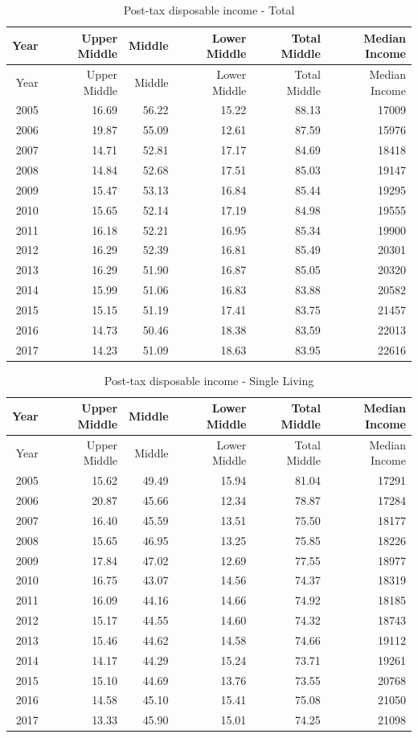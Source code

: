 \documentclass[12pt,]{article}
\begin{document}
\begin{longtable}[]{@{}rrrrrr@{}}
\caption{Post-tax disposable income - Total}\tabularnewline
\toprule
Year & Upper Middle & Middle & Lower Middle & Total Middle & Median
Income\tabularnewline
\midrule
\endfirsthead
\toprule
Year & Upper Middle & Middle & Lower Middle & Total Middle & Median
Income\tabularnewline
\midrule
\endhead
2005 & 16.69 & 56.22 & 15.22 & 88.13 & 17009\tabularnewline
2006 & 19.87 & 55.09 & 12.61 & 87.59 & 15976\tabularnewline
2007 & 14.71 & 52.81 & 17.17 & 84.69 & 18418\tabularnewline
2008 & 14.84 & 52.68 & 17.51 & 85.03 & 19147\tabularnewline
2009 & 15.47 & 53.13 & 16.84 & 85.44 & 19295\tabularnewline
2010 & 15.65 & 52.14 & 17.19 & 84.98 & 19555\tabularnewline
2011 & 16.18 & 52.21 & 16.95 & 85.34 & 19900\tabularnewline
2012 & 16.29 & 52.39 & 16.81 & 85.49 & 20301\tabularnewline
2013 & 16.29 & 51.90 & 16.87 & 85.05 & 20320\tabularnewline
2014 & 15.99 & 51.06 & 16.83 & 83.88 & 20582\tabularnewline
2015 & 15.15 & 51.19 & 17.41 & 83.75 & 21457\tabularnewline
2016 & 14.73 & 50.46 & 18.38 & 83.59 & 22013\tabularnewline
2017 & 14.23 & 51.09 & 18.63 & 83.95 & 22616\tabularnewline
\bottomrule
\end{longtable}

\begin{longtable}[]{@{}rrrrrr@{}}
\caption{Post-tax disposable income - Single Living}\tabularnewline
\toprule
Year & Upper Middle & Middle & Lower Middle & Total Middle & Median
Income\tabularnewline
\midrule
\endfirsthead
\toprule
Year & Upper Middle & Middle & Lower Middle & Total Middle & Median
Income\tabularnewline
\midrule
\endhead
2005 & 15.62 & 49.49 & 15.94 & 81.04 & 17291\tabularnewline
2006 & 20.87 & 45.66 & 12.34 & 78.87 & 17284\tabularnewline
2007 & 16.40 & 45.59 & 13.51 & 75.50 & 18177\tabularnewline
2008 & 15.65 & 46.95 & 13.25 & 75.85 & 18226\tabularnewline
2009 & 17.84 & 47.02 & 12.69 & 77.55 & 18977\tabularnewline
2010 & 16.75 & 43.07 & 14.56 & 74.37 & 18319\tabularnewline
2011 & 16.09 & 44.16 & 14.66 & 74.92 & 18185\tabularnewline
2012 & 15.17 & 44.55 & 14.60 & 74.32 & 18743\tabularnewline
2013 & 15.46 & 44.62 & 14.58 & 74.66 & 19112\tabularnewline
2014 & 14.17 & 44.29 & 15.24 & 73.71 & 19261\tabularnewline
2015 & 15.10 & 44.69 & 13.76 & 73.55 & 20768\tabularnewline
2016 & 14.58 & 45.10 & 15.41 & 75.08 & 21050\tabularnewline
2017 & 13.33 & 45.90 & 15.01 & 74.25 & 21098\tabularnewline
\bottomrule
\end{longtable}
\end{document}
